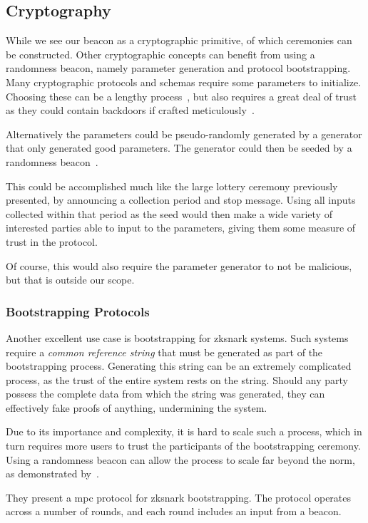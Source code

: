 \subsection{Cryptography}
While we see our beacon as a cryptographic primitive, of which ceremonies can be constructed.
Other cryptographic concepts can benefit from using a randomness beacon, namely parameter generation and protocol bootstrapping.
Many cryptographic protocols and schemas require some parameters to initialize.
Choosing these can be a lengthy process~\cite{mpcsnarks}, but also requires a great deal of trust as they could contain backdoors if crafted meticulously~\cite{nist2014backdoor}.

Alternatively the parameters could be pseudo-randomly generated by a generator that only generated good parameters.
The generator could then be seeded by a randomness beacon~\cite{baigneres2015trap}.

This could be accomplished much like the large lottery ceremony previously presented, by announcing a collection period and stop message.
Using all inputs collected within that period as the seed would then make a wide variety of interested parties able to input to the parameters, giving them some measure of trust in the protocol.

Of course, this would also require the parameter generator to not be malicious, but that is outside our scope.

\subsubsection{Bootstrapping Protocols}%
\label{ssub:bootstrapping_protocols}
Another excellent use case is bootstrapping for \gls{zksnark} systems.
Such systems require a \emph{common reference string} that must be generated as part of the bootstrapping process.
Generating this string can be an extremely complicated process, as the trust of the entire system rests on the string.
Should any party possess the complete data from which the string was generated, they can effectively fake proofs of anything, undermining the system.

Due to its importance and complexity, it is hard to scale such a process, which in turn requires more users to trust the participants of the bootstrapping ceremony.
Using a randomness beacon can allow the process to scale far beyond the norm, as demonstrated by~\citet{mpcsnarks}.

They present a \acrshort{mpc} protocol for \acrshort{zksnark} bootstrapping.
The protocol operates across a number of rounds, and each round includes an input from a beacon.


